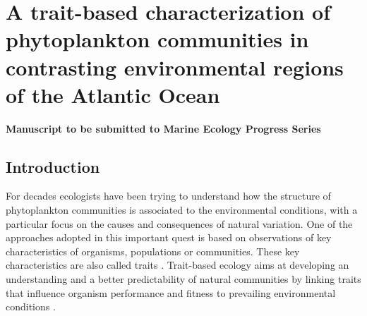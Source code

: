 \chapter{A trait-based characterization of phytoplankton communities in contrasting environmental regions of the Atlantic Ocean}

\small {\textbf{Manuscript to be submitted to Marine Ecology Progress Series}}


\normalsize
\section{Introduction}
For decades ecologists have been trying to understand how the structure of phytoplankton communities is associated to the environmental conditions, with a particular focus on the causes and consequences of natural variation. One of the approaches adopted in this important quest is based on observations of key characteristics of organisms, populations or communities. These key characteristics are also called traits \citep{McGill2006, Violle2007}. Trait-based ecology aims at developing an understanding and a better predictability of natural communities by linking traits that influence organism performance and fitness to prevailing environmental conditions \citep{McGill2006}. 

